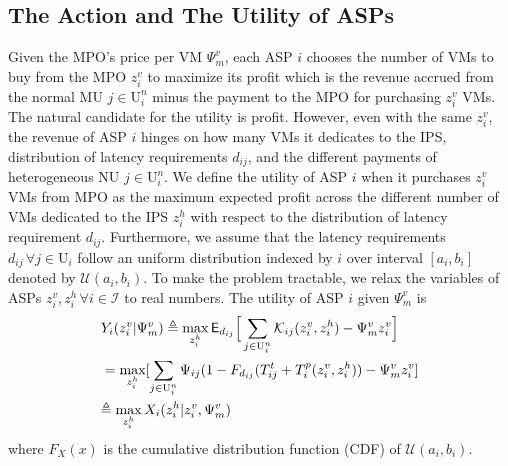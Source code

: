 \documentclass[10pt,journal, compsoc]{IEEEtran}
\begin{document}
\subsection{The Action and The Utility of ASPs}
Given the MPO's price per VM $\Psi_m^v$, each ASP $i$ chooses the number of VMs to buy from the MPO $z_i^v$ to maximize its profit which is the revenue accrued from the normal MU $j \in \mathrm{U}_i^n$ minus the payment to the MPO for purchasing $z_i^v$ VMs. The natural candidate for the utility is profit. However, even with the same $z_i^v$, the revenue of ASP $i$ hinges on how many VMs it dedicates to the IPS, distribution of latency requirements $d_{ij}$, and the different payments of heterogeneous NU $j \in \mathrm{U}_i^n$. We define the utility of ASP $i$ when it purchases $z_i^v$ VMs from MPO as the maximum expected profit across the different number of VMs dedicated to the IPS $z_i^h$ with respect to the distribution of latency requirement $d_{ij}$. Furthermore, we assume that the latency requirements $d_{ij} \, \forall j \in \mathrm{U}_i$ follow an uniform distribution indexed by $i$ over interval $[a_i, b_i]$ denoted by $\mathcal{U}(a_i,b_i)$. To make the problem tractable, we relax the variables of ASPs $z_i^v, z_i^h \, \forall i \in \mathcal{I}$ to real numbers. The utility of ASP $i$ given $\Psi_m^v$ is
\begin{align}
&Y_i(z_i^v|\Psi_m^v) \triangleq \max_{z_i^h} \mathsf{E}_{d_{ij}}\Big[\sum_{j \in \mathrm{U}_i^n} \mathcal{K}_{ij}(z_i^v, z_i^h) - \Psi_m^v z_i^v\Big] 
\hspace*{-1mm}
\iffalse=\max_{z_i^h} \mathsf{E}_{d_{ij}}[\sum_{j \in \mathrm{U}_i^n}\Psi_{ij}\mathds{1}\{T_{ij}^t + T_i^p(z_i^v, z_i^h) \leq d_{ij}\} - \Psi_m^vz_i^v] \nonumber \fi\\
\hspace*{-1mm}&=\max_{z_i^h} [\sum_{j \in \mathrm{U}_i^n}\Psi_{ij}(1-F_{d_{ij}}(T_{ij}^t+T_i^p(z_i^v, z_i^h)) - \Psi_m^vz_i^v] \\ %
&\hspace*{-1mm}\triangleq \max_{z_i^h} X_i(z_i^h|z_i^v,\Psi_m^v) \label{eqn:asp_def_subobjective}
\end{align}
where $F_{X}(x)$ is the cumulative distribution function (CDF) of $\mathcal{U}(a_i,b_i)$.
\end{document}
